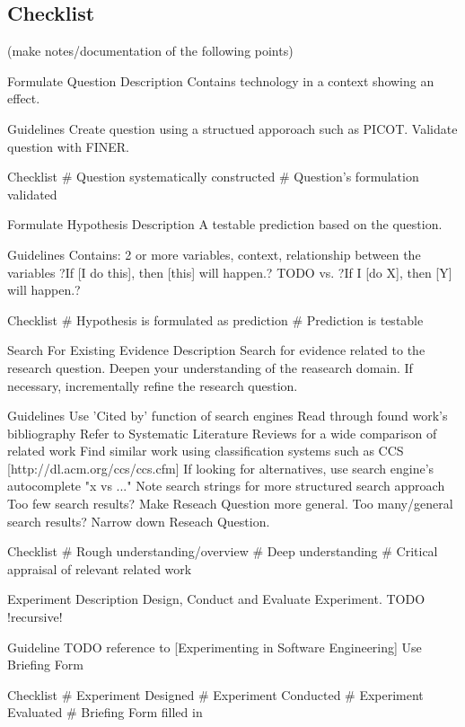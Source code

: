 
\newpage
\subsection{Checklist}

(make notes/documentation of the following points)


Formulate Question
	Description
		Contains technology in a context showing an effect.
	
	Guidelines
		Create question using a structued apporoach such as PICOT. 
		Validate question with FINER.
	
	Checklist
		\# Question systematically constructed
		\# Question's formulation validated			
				
				
Formulate Hypothesis
	Description
		A testable prediction based on the question.

	Guidelines
		Contains: 2 or more variables, context, relationship between the variables
		?If [I do this], then [this] will happen.? TODO vs. ?If I [do X], then [Y] will happen.?
		
	Checklist
		\# Hypothesis is formulated as prediction
		\# Prediction is testable
		
Search For Existing Evidence
	Description
		Search for evidence related to the research question.
		Deepen your understanding of the reasearch domain.
		If necessary, incrementally refine the research question.
	
	Guidelines
		Use 'Cited by' function of search engines
		Read through found work's bibliography
		Refer to Systematic Literature Reviews for a wide comparison of related work
		Find similar work using classification systems such as CCS [http://dl.acm.org/ccs/ccs.cfm]
		If looking for alternatives, use search engine's autocomplete "x vs ..."
		Note search strings for more structured search approach
		Too few search results? Make Reseach Question more general.
		Too many/general search results? Narrow down Reseach Question.
		
	Checklist
		\# Rough understanding/overview
		\# Deep understanding
		\# Critical appraisal of relevant related work
	
	
Experiment	
	Description
		Design, Conduct and Evaluate Experiment.
		TODO !recursive!
	
	Guideline
		TODO reference to [Experimenting in Software Engineering]
		Use Briefing Form
		
	Checklist
		\# Experiment Designed
		\# Experiment Conducted
		\# Experiment Evaluated
		\# Briefing Form filled in
		

